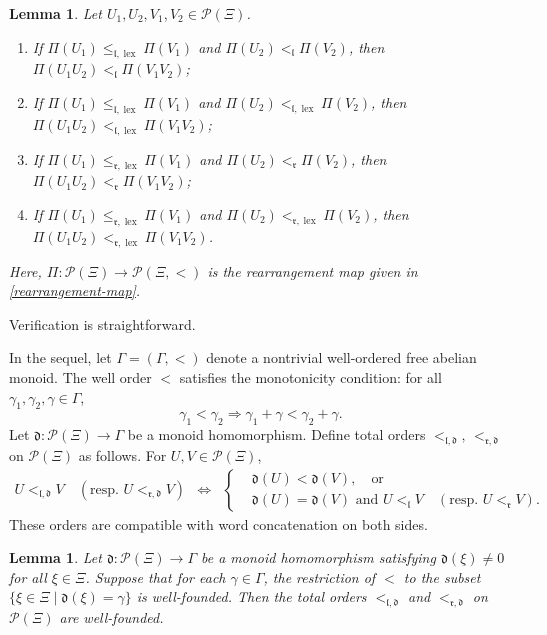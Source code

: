 \documentclass{article}
\makeatletter
\renewenvironment{proof}[1][\proofname]{\par
	\pushQED{\qed}%
	\normalfont \topsep6\p@\@plus6\p@\relax
	\trivlist
	\item[\hskip\labelsep
	\bfseries
	#1\@addpunct{.}]\ignorespaces
}{%
	\popQED\endtrivlist\@endpefalse
}
\theoremstyle{plain}
\newtheorem{lemma}[thm]{Lemma}
\theoremstyle{definition}
\numberwithin{equation}{section}
\DeclareMathOperator{\lex}{lex}
\newcommand{\PP}{\mathcal{P}}
\newcommand{\dd}{\mathfrak{d}}
\newcommand{\rr}{\mathfrak{r}}
\makeatother
\begin{document}
	\begin{lemma}\label{order-compare-rearrangement}
		Let $U_{1}, U_{2}, V_{1}, V_{2} \in \PP(\Xi)$.
		\begin{enumerate}
			\item If $\Pi(U_{1})\leq _{\mathfrak{l},\lex} \Pi(V_{1})$ and $\Pi(U_{2})<_{\mathfrak{l}} \Pi(V_{2})$, then $\Pi(U_{1}U_{2}) <_{\mathfrak{l}} \Pi(V_{1} V_{2})$;
			\item If $\Pi(U_{1})\leq _{\mathfrak{l},\lex} \Pi(V_{1})$ and $\Pi(U_{2})<_{\mathfrak{l},\lex} \Pi(V_{2})$, then $\Pi(U_{1}U_{2}) <_{\mathfrak{l},\lex} \Pi(V_{1} V_{2})$;
			\item If $\Pi(U_{1})\leq _{\rr ,\lex} \Pi(V_{1})$ and $\Pi(U_{2})<_{\rr } \Pi(V_{2})$, then $\Pi(U_{1}U_{2}) <_{\rr } \Pi(V_{1} V_{2})$;
			\item If $\Pi(U_{1})\leq _{\rr ,\lex} \Pi(V_{1})$ and $\Pi(U_{2})<_{\rr ,\lex} \Pi(V_{2})$, then $\Pi(U_{1}U_{2}) <_{\rr ,\lex} \Pi(V_{1} V_{2})$.
		\end{enumerate}
		Here, $\Pi:\PP(\Xi)\to \PP(\Xi,<)$ is  the rearrangement map given in \eqref{rearrangement-map}.
	\end{lemma}
	\begin{proof}
		Verification is straightforward.
	\end{proof}
	
	In the sequel, let $\Gamma= (\Gamma,<)$ denote a nontrivial well-ordered free abelian monoid. The well order $<$ satisfies the monotonicity condition: for all $\gamma_{1}, \gamma_{2}, \gamma \in \Gamma$,
	\[
	\gamma_{1} <\gamma_{2} \Longrightarrow \gamma_{1} +\gamma <\gamma_{2} +\gamma.
	\]
	Let $\dd\colon\PP(\Xi)\to \Gamma$ be a monoid homomorphism. Define total orders $<_{\mathfrak{l}, \dd}, \, <_{\rr , \dd}$ on $\PP(\Xi)$ as follows. For $U,V\in \PP(\Xi)$,
	\begin{eqnarray*}
		U <_{\mathfrak{l}, \dd} V \quad(\text{resp. } U <_{\rr , \dd} V)
		& \Longleftrightarrow &
		\left\{
		\begin{aligned}
			& \dd(U)<\dd(V), \quad \text{or} \\
			&\dd(U)=\dd(V) \text{ and } U <_{\mathfrak{l}} V \quad(\text{resp. } U <_{\rr } V).
		\end{aligned}\right .
	\end{eqnarray*}
	These orders are compatible with word concatenation on both sides.
	
	\begin{lemma}\label{wellorder}
		Let $\dd\colon\PP(\Xi)\to \Gamma$ be a monoid homomorphism satisfying $\dd(\xi)\neq 0$ for all $\xi\in \Xi$. Suppose that for each $\gamma\in \Gamma$, the restriction of $<$ to the subset $\{\xi \in \Xi \mid\dd(\xi)=\gamma\}$ is well-founded. Then the total orders $<_{\mathfrak{l}, \dd}$ and $<_{\rr , \dd}$ on $\PP(\Xi)$ are well-founded.
	\end{lemma}
	
\end{document}
